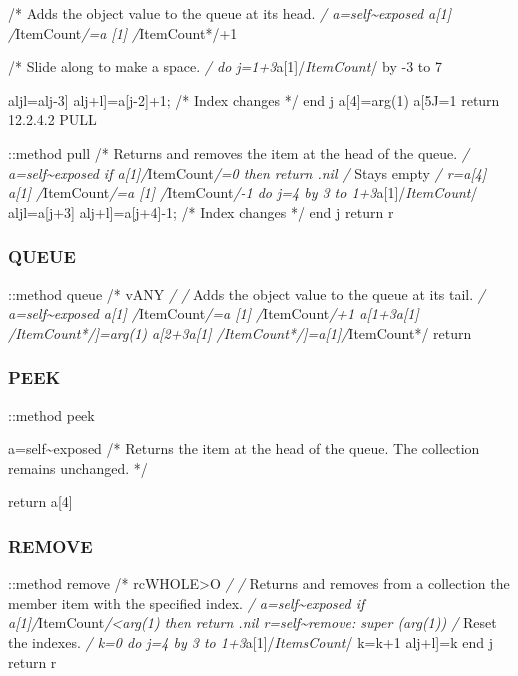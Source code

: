 /* Adds the object value to the queue at its head. \emph{/
a=self\textasciitilde exposed a{[}1{]} /}ItemCount\emph{/=a {[}1{]}
/}ItemCount*/+1

/* Slide along to make a space. \emph{/ do
j=1+3}a{[}1{]}/\emph{ItemCount}/ by -3 to 7

aljl=alj-3{]} alj+l{]}=a{[}j-2{]}+1; /* Index changes */ end j
a{[}4{]}=arg(1) a{[}5J=1 return 12.2.4.2 PULL

::method pull /* Returns and removes the item at the head of the queue.
\emph{/ a=self\textasciitilde exposed if a{[}1{]}/}ItemCount\emph{/=0
then return .nil /} Stays empty \emph{/ r=a{[}4{]} a{[}1{]}
/}ItemCount\emph{/=a {[}1{]} /}ItemCount\emph{/-1 do j=4 by 3 to
1+3}a{[}1{]}/\emph{ItemCount}/ aljl=a{[}j+3{]} alj+l{]}=a{[}j+4{]}-1; /*
Index changes */ end j return r

\hypertarget{queue}{%
\subsubsection{QUEUE}\label{queue}}

::method queue /* vANY \emph{/ /} Adds the object value to the queue at
its tail. \emph{/ a=self\textasciitilde exposed a{[}1{]}
/}ItemCount\emph{/=a {[}1{]} /}ItemCount\emph{/+1 a{[}1+3\emph{a{[}1{]}
/}ItemCount*/{]}=arg(1) a{[}2+3\emph{a{[}1{]}
/}ItemCount*/{]}=a{[}1{]}/}ItemCount*/ return

\hypertarget{peek}{%
\subsubsection{PEEK}\label{peek}}

::method peek

a=self\textasciitilde exposed /* Returns the item at the head of the
queue. The collection remains unchanged. */

return a{[}4{]}

\hypertarget{remove-1}{%
\subsubsection{REMOVE}\label{remove-1}}

::method remove /* rcWHOLE\textgreater O \emph{/ /} Returns and removes
from a collection the member item with the specified index. \emph{/
a=self\textasciitilde exposed if
a{[}1{]}/}ItemCount\emph{/\textless arg(1) then return .nil
r=self\textasciitilde remove: super (arg(1)) /} Reset the indexes.
\emph{/ k=0 do j=4 by 3 to 1+3}a{[}1{]}/\emph{ItemsCount}/ k=k+1
alj+l{]}=k end j return r

